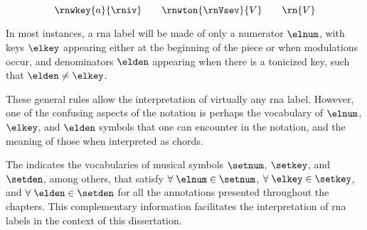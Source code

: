 \begin{equation}
    \label{eq:rn_three_annotations}
    \rnwkey{a}{\rniv} \qquad \rnwton{\rnVsev}{V} \qquad \rn{V}
\end{equation}


In most instances, a \gls{rna} label will be made of only a
numerator $\elnum$, with keys $\elkey$ appearing either at
the beginning of the piece or when modulations occur, and
denominators $\elden$ appearing when there is a tonicized
key, such that $\elden \neq \elkey$.

These general rules allow the interpretation of virtually
any \gls{rna} label. However, one of the confusing aspects
of the notation is perhaps the vocabulary of $\elnum$,
$\elkey$, and $\elden$ symbols that one can encounter in the
notation, and the meaning of those when interpreted as
chords.

The 
indicates the vocabularies of musical symbols $\setnum$,
$\setkey$, and $\setden$, among others, that satisfy
$\forall \; \elnum \in \setnum$, $\forall \; \elkey \in
\setkey$, and $\forall \; \elden \in \setden$ for all the
annotations presented throughout the chapters. This
complementary information facilitates the interpretation of
\gls{rna} labels in the context of this dissertation.
